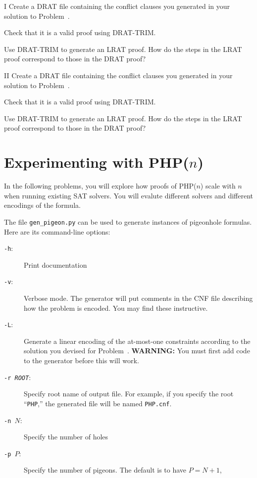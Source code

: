 \begin{problem}{I}
Create a DRAT file containing the conflict clauses you generated in your solution to Problem~.
\begin{choice}
\item
Check that it is a valid proof using DRAT-TRIM.
\item
Use DRAT-TRIM to generate an LRAT proof.  How do the steps in the LRAT proof correspond to those in the DRAT proof?
\end{choice}
\end{problem}

\begin{problem}{II}
Create a DRAT file containing the conflict clauses you generated in your solution to Problem~.
\begin{choice}
\item
Check that it is a valid proof using DRAT-TRIM.
\item
Use DRAT-TRIM to generate an LRAT proof.  How do the steps in the LRAT proof correspond to those in the DRAT proof?
\end{choice}
\end{problem}

\newpage

\section*{Experimenting with PHP($n$)}

In the following problems, you will explore how proofs of PHP($n$)
scale with $n$ when running existing SAT solvers.  You will evalute
different solvers and different encodings of the formula.

The file \texttt{gen\_pigeon.py} can be used to generate
instances of pigeonhole formulas.  Here are its command-line options:
\begin{description}
\item[\texttt{-h}:] Print documentation
\item[\texttt{-v}:] Verbose mode.
  The generator will put comments in
  the CNF file describing how the problem is encoded.  You may find
  these instructive.
\item[\texttt{-L}:] Generate a linear encoding of the at-most-one
  constraints according to the solution you devised for
  Problem~.  {\bf WARNING:} You must first add code
  to the generator before this will work.
\item[\texttt{-r \textit{ROOT}}:]
  Specify root name of output file.  For example, if you specify the
  root ``\texttt{PHP},'' the generated file will be named
  \texttt{PHP.cnf}.
\item[\texttt{-n $N$}:]
  Specify the number of holes
\item[\texttt{-p $P$}:]
  Specify the number of pigeons.  The default is to have $P=N+1$,
\end{description}

